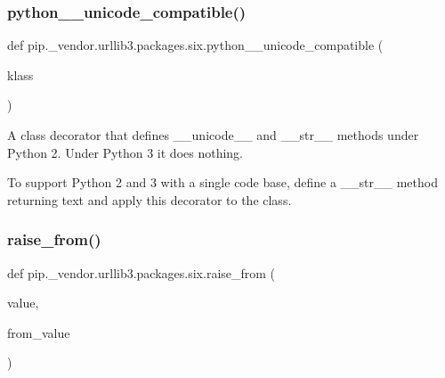 \subsubsection{\texorpdfstring{python\+\_\+\_\+unicode\+\_\+compatible()}{python\_2\_unicode\_compatible()}}
{\footnotesize\ttfamily def pip.\+\_\+vendor.\+urllib3.\+packages.\+six.\+python\+\_\+\_\+unicode\+\_\+compatible (\begin{DoxyParamCaption}\item[{}]{klass }\end{DoxyParamCaption})}

\begin{DoxyVerb}A class decorator that defines __unicode__ and __str__ methods under Python 2.
Under Python 3 it does nothing.

To support Python 2 and 3 with a single code base, define a __str__ method
returning text and apply this decorator to the class.
\end{DoxyVerb}
 \mbox{\label{namespacepip_1_1__vendor_1_1urllib3_1_1packages_1_1six_a92e3c2348b2b3524dd5131cbb532eaa1}} 
\subsubsection{\texorpdfstring{raise\+\_\+from()}{raise\_from()}}
{\footnotesize\ttfamily def pip.\+\_\+vendor.\+urllib3.\+packages.\+six.\+raise\+\_\+from (\begin{DoxyParamCaption}\item[{}]{value,  }\item[{}]{from\+\_\+value }\end{DoxyParamCaption})}

\mbox{\label{namespacepip_1_1__vendor_1_1urllib3_1_1packages_1_1six_ab0e0d6749da646c42c4a26e1ebdfe100}} 
